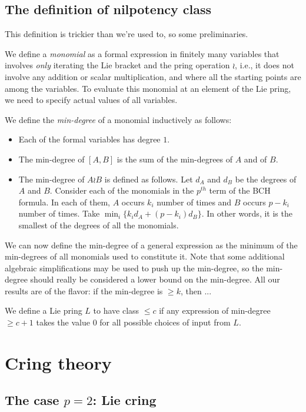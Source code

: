 \documentclass[10pt]{amsart}
\begin{document}
\subsection{The definition of nilpotency class}

This definition is trickier than we're used to, so some preliminaries.

We define a {\em monomial} as a formal expression in finitely many
variables that involves {\em only} iterating the Lie bracket and the
pring operation $\wr$, i.e., it does not involve any addition or
scalar multiplication, and where all the starting points are among the
variables. To evaluate this monomial at an element of the Lie pring,
we need to specify actual values of all variables.

We define the {\em min-degree} of a monomial inductively as follows:

\begin{itemize}
\item Each of the formal variables has degree $1$.
\item The min-degree of $[A,B]$ is the sum of the min-degrees of $A$
  and of $B$.
\item The min-degree of $A \wr B$ is defined as follows. Let $d_A$ and
  $d_B$ be the degrees of $A$ and $B$. Consider each of the monomials
  in the $p^{th}$ term of the BCH formula. In each of them, $A$ occurs
  $k_i$ number of times and $B$ occurs $p - k_i$ number of times. Take
  $\min_i \{ k_id_A + (p - k_i)d_B \}$. In other words, it is the
  smallest of the degrees of all the monomials.
\end{itemize}

We can now define the min-degree of a general expression as the
minimum of the min-degrees of all monomials used to constitute
it. Note that some additional algebraic simplifications may be used to
push up the min-degree, so the min-degree should really be considered
a lower bound on the min-degree. All our results are of the flavor: if
the min-degree is $\ge k$, then ...

We define a Lie pring $L$ to have class $\le c$ if any expression of
min-degree $\ge c + 1$ takes the value $0$ for all possible choices of
input from $L$.


\section{Cring theory}

\subsection{The case $p = 2$: Lie cring}
\end{document}
